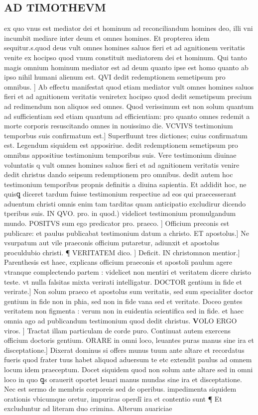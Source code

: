\documentclass{article}
\begin{document}
\begin{pages}
\section*{AD TIMOTHEVM }\pstart ex quo vnus est mediator dei et hominum ad reconciliandum homines deo, illi vni incumbit mediare inter deum et omnes homines. Et propterea idem sequitur.s.quod deus vult omnes homines saluos fieri et ad agnitionem veritatis venite  ex hocipso quod vnum constituit mediatorem dei et hominum. Qui tanto magis omnium hominum mediator est ad deum quanto ipse est homo  quanto ab ipso nihil humani alienum est. QVI dedit redemptionem semetipsum pro omnibus. ] Ab effectu manifestat quod etiam mediator vult omnes homines saluos fieri et ad agnitionem veritatis veniretex hocipso quod dedit semetipsum precium ad redimendum non aliquos sed omnes. Quod verissimum est non solum quantum ad sufficientiam sed etiam quantum ad efficientiam: pro quanto omnes redemit a morte corporis resuscitando omnes in nouissimo die. VCVIVS testimonium temporbus suis confirmatum est.] Superfluunt tres dictiones; cuius confirmatum est. Legendum siquidem est apposiriue. dedit redemptionem semetipsum pro omnibns appositiue testimonium temporibus suis. Vere testimonium diuinae voluntatis q vult omnes homines saluos fieri et ad agnitionem veritatis venire  dedit christus dando seipsum redemptionem pro omnibus. dedit autem hoc testimonium temporibus propnis definitis a diuina sapientia. Et addidit hoc, ne quisꝗ diceret tardum fuisse testimonium respectiue ad eos qui praecesserant aduentum christi omnis enim tam tarditas quam anticipatio excludirur dicendo tperibus suis. IN QVO. pro. in quod.) videlicet testimonium promulgandum mundo. POSITVS sum ego predicator pro. praeco. ] Officium preconis est publicare: et paulus publicabat testimonium datum a christo. ET apostolus.] Ne vsurpatum aut vile praeconis officium putaretur, adiunxit et apostolus  proculdubio christi. ¶ VERITATEM dico. ] Deficit. IN christomnon mentior.] Parenthesis est haec, explicans officium praeconis et apostoli paulum agere vtranque  complectendo partem : videlicet non mentiri et veritatem dicere christo teste. vt nulla falsitas mixta verirati intelligatur. DOCTOR gentium in fide et verirate.] Non solum praeco et apostolus sum veritatis, sed sum specialiter doctor gentium in fide non in pħia, sed non in fide vana  sed et veritate. Doceo gentes veritatem  non figmenta : verum non in euidentia scientifica sed in fide. et haec omnia ago ad publicandum testimonium quod dedit christus.  \pend\pstart \huge\textbf{V}\normalsize OLO ERGO viros. ] Tractat illam particulam  de corde puro. Continuat autem exercens officium doctoris gentium. ORARE in omni loco, leuantes puras manus sine ira et disceptatione.] Dixerat dominus  si offers munus tuum ante altare et recordatus fueris quod frater tuus habet aliquod  aduersum te etc extendit paulus ad omnem locum idem praeceptum. Docet siquidem quod non solum ante altare sed in omni loco in quo ꝗs orauerit oportet leuari manus mundas sine ira et disceptatione. Nec est sermo de membris corporeis sed de operibus. impedimenta siquidem orationis vbicumque  oretur, impuriras operdĩ  ira et contentio sunt ¶ Et excluduntur ad literam duo crimina. Alterum auariciae 
\end{pages}
\end{document}
